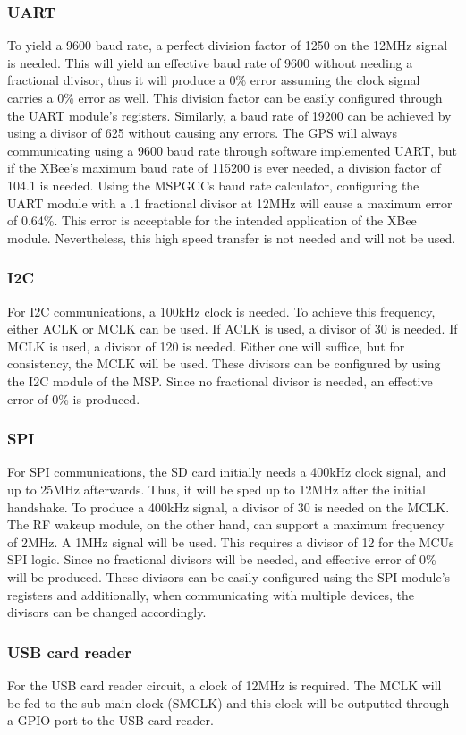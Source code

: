 \subsubsection{UART}
To yield a 9600 baud rate, a perfect division factor of 1250 on the 12MHz signal is needed. This will yield an effective baud rate of 9600 without needing a fractional divisor, thus it will produce a 0\% error assuming the clock signal carries a 0\% error as well. This division factor can be easily configured through the UART module's registers. Similarly, a baud rate of 19200 can be achieved by using a divisor of 625 without causing any errors. The GPS will always communicating using a 9600 baud rate through software implemented UART, but if the XBee's maximum baud rate of 115200 is ever needed, a division factor of 104.1 is needed. Using the MSPGCCs baud rate calculator, configuring the UART module with a .1 fractional divisor at 12MHz will cause a maximum error of 0.64\%. This error is acceptable for the intended application of the XBee module. Nevertheless, this high speed transfer is not needed and will not be used.

\subsubsection{I2C}
For I2C communications, a 100kHz clock is needed. To achieve this frequency, either ACLK or MCLK can be used. If ACLK is used, a divisor of 30 is needed. If MCLK is used, a divisor of 120 is needed. Either one will suffice, but for consistency, the MCLK will be used. These divisors can be configured by using the I2C module of the MSP. Since no fractional divisor is needed, an effective error of 0\% is produced.

\subsubsection{SPI}
For SPI communications, the SD card initially needs a 400kHz clock signal, and up to 25MHz afterwards. Thus, it will be sped up to 12MHz after the initial handshake. To produce a 400kHz signal, a divisor of 30 is needed on the MCLK. The RF wakeup module, on the other hand, can support a maximum frequency of 2MHz. A 1MHz signal will be used. This requires a divisor of 12 for the MCUs SPI logic. Since no fractional divisors will be needed, and effective error of 0\% will be produced. These divisors can be easily configured using the SPI module's registers and additionally, when communicating with multiple devices, the divisors can be changed accordingly.

\subsubsection{USB card reader}
For the USB card reader circuit, a clock of 12MHz is required. The MCLK will be fed to the sub-main clock (SMCLK) and this clock will be outputted through a GPIO port to the USB card reader.

